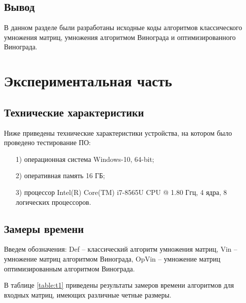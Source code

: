 \documentclass[12pt]{report}
\begin{document}
	\section*{Вывод}
	
	В данном разделе были разработаны исходные коды алгоритмов классического умножения матриц, умножения алгоритмом Винограда и оптимизированного Винограда.
	
	\chapter{Экспериментальная часть}
	
	\section{Технические характеристики}
	
	Ниже приведены технические характеристики устройства, на котором было проведено тестирование ПО:
	
	\begin{enumerate}
		\item[1)] операционная система Windows-10, 64-bit;
		\item[2)] оперативная память 16 ГБ;
		\item[3)] процессор Intel(R) Core(TM) i7-8565U CPU @ 1.80 Ггц, 4 ядра, 8 логических процессоров.
	\end{enumerate}
	
	\section{Замеры времени}
	
	Введем обозначения: Def -- классический алгоритм умножения матриц, Vin -- умножение матриц алгоритмом Винограда, OpVin -- умножение матриц оптимизированным алгоритмом Винограда.
	
	В таблице \ref{table:t1} приведены результаты замеров времени алгоритмов для входных матриц, имеющих различные четные размеры.
	
\end{document}
